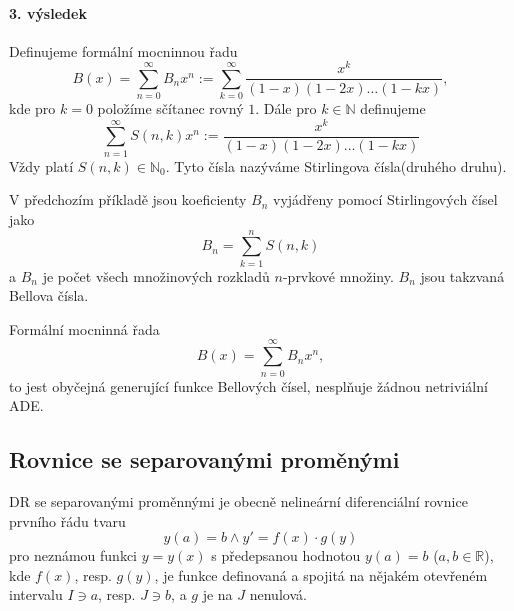 \documentclass[../main.tex]{subfiles}
\begin{document}
\paragraph{3. výsledek}

\begin{example}
    Definujeme formální mocninnou řadu
    \[ B(x) = \sum_{n=0}^{\infty} B_nx^n := \sum_{k=0}^{\infty}\frac{x^k}{(1-x)(1-2x)\dots(1-kx)}, \]
    kde pro $k=0$ položíme sčítanec rovný $1$. Dále pro $k\in \mathbb{N}$ definujeme
    \[ \sum_{n=1}^{\infty} S(n,k)x^n := \frac{x^k}{(1-x)(1-2x)\dots(1-kx)} \]
    Vždy platí $S(n,k)\in\mathbb{N}_0$. Tyto čísla nazýváme Stirlingova čísla(druhého druhu).
\end{example}

\begin{example}
    V předchozím příkladě jsou koeficienty $B_n$ vyjádřeny pomocí Stirlingových čísel jako
    \[ B_n = \sum_{k=1}^n S(n,k) \]
    a $B_n$ je počet všech množinových rozkladů $n$-prvkové množiny. $B_n$ jsou takzvaná Bellova čísla.
\end{example}

\begin{theorem}[Klazar]
    Formální mocninná řada
    \[ B(x) = \sum_{n=0}^\infty B_nx^n, \]
    to jest obyčejná generující funkce Bellových čísel, nesplňuje žádnou netriviální ADE.
\end{theorem}

\subsection{Rovnice se separovanými proměnými}

\begin{definition}
    DR se separovanými proměnnými je obecně nelineární diferenciální rovnice prvního řádu tvaru
    \[ y(a) = b \land y' = f(x)\cdot g(y) \]
    pro neznámou funkci $y = y(x)$ s předepsanou hodnotou $y(a) = b$ ($a,b\in\mathbb{R}$), kde $f(x)$, resp. $g(y)$, je
    funkce definovaná a spojitá na nějakém otevřeném intervalu $I \ni a$, resp. $J \ni b$, a $g$ je na $J$ nenulová.
\end{definition}
\end{document}
